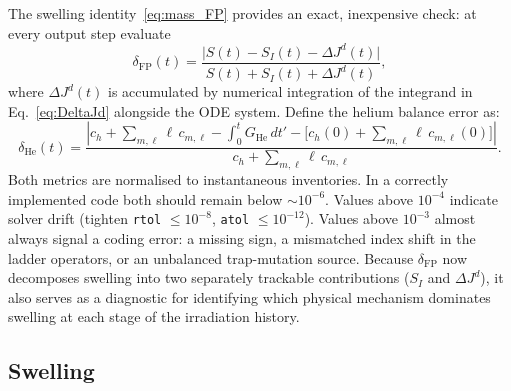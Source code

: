 \documentclass[pdflatex,sn-basic]{sn-jnl} %
\begin{document}
The swelling identity~\eqref{eq:mass_FP} provides an exact, inexpensive
check: at every output step evaluate
\begin{equation}\label{eq:delta_FP}
    \delta_{\mathrm{FP}}(t)
    = \frac{\bigl|S(t) - S_I(t) - \Delta J^d(t)\bigr|}
           {S(t) + S_I(t) + \Delta J^d(t)},
\end{equation}
where $\Delta J^d(t)$ is accumulated by numerical integration of the
integrand in Eq.~\eqref{eq:DeltaJd} alongside the ODE system. Define
the helium balance error as:
\begin{equation}\label{eq:delta_He}
    \delta_{\mathrm{He}}(t)
    = \frac{\displaystyle
       \left|c_h + \sum_{m,\ell}\ell\,c_{m,\ell}
       - \int_0^t G_{\mathrm{He}}\,dt'
       - \bigl[c_h(0) + \sum_{m,\ell}\ell\,c_{m,\ell}(0)\bigr]\right|}
      {\displaystyle c_h + \sum_{m,\ell}\ell\,c_{m,\ell}}.
\end{equation}
Both metrics are normalised to instantaneous inventories. In a correctly
implemented code both should remain below $\sim 10^{-6}$. Values above
$10^{-4}$ indicate solver drift (tighten \texttt{rtol} $\leq 10^{-8}$,
\texttt{atol} $\leq 10^{-12}$). Values above $10^{-3}$ almost always
signal a coding error: a missing sign, a mismatched index shift in the
ladder operators, or an unbalanced trap-mutation source. Because
$\delta_{\mathrm{FP}}$ now decomposes swelling into two separately
trackable contributions ($S_I$ and $\Delta J^d$), it also serves as a
diagnostic for identifying which physical mechanism dominates swelling
at each stage of the irradiation history.


\subsection{Swelling}
\label{sec:swelling}
\end{document}
